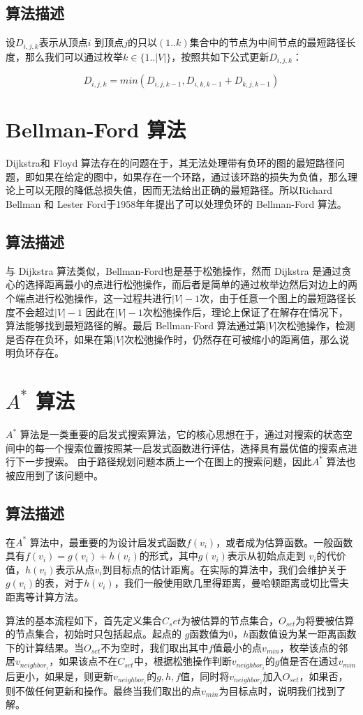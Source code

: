 \documentclass{standalone}
\begin{document}
\subsection{算法描述}
设$D_{i,j,k}$表示从顶点$i$ 到顶点$j$的只以$(1..k)$集合中的节点为中间节点的最短路径长度，那么我们可以通过枚举$k \in \{1..|V|\}$，按照共如下公式更新$D_{i,j,k}$：
\begin{center}
    \begin{equation}
    D_{i,j,k} = min(D_{i,j,k-1}, D_{i,k,k-1} + D_{k,j,k-1})
\end{equation}
\end{center}
\section{Bellman-Ford 算法}
Dijkstra和 Floyd 算法存在的问题在于，其无法处理带有负环的图的最短路径问题，即如果在给定的图中，如果存在一个环路，通过该环路的损失为负值，那么理论上可以无限的降低总损失值，因而无法给出正确的最短路径。所以Richard Bellman 和 Lester Ford于1958年年提出了可以处理负环的 Bellman-Ford 算法。
\subsection{算法描述}
与 Dijkstra 算法类似，Bellman-Ford也是基于松弛操作，然而 Dijkstra 是通过贪心的选择距离最小的点进行松弛操作，而后者是简单的通过枚举边然后对边上的两个端点进行松弛操作，这一过程共进行$|V|-1$次，由于任意一个图上的最短路径长度不会超过$|V|-1$
因此在$|V|-1$次松弛操作后，理论上保证了在解存在情况下，算法能够找到最短路径的解。最后 Bellman-Ford 算法通过第$|V|$次松弛操作，检测是否存在负环，如果在第$|V|$次松弛操作时，仍然存在可被缩小的距离值，那么说明负环存在。
\section{$A^{*}$ 算法}
$A^{*}$ 算法是一类重要的启发式搜索算法，它的核心思想在于，通过对搜索的状态空间中的每一个搜索位置按照某一启发式函数进行评估，选择具有最优值的搜索点进行下一步搜索。
由于路径规划问题本质上一个在图上的搜索问题，因此$A^{*}$ 算法也被应用到了该问题中。
\subsection{算法描述}
在$A^{*}$ 算法中，最重要的为设计启发式函数$f(v_i)$，或者成为估算函数。一般函数具有$f(v_i) = g(v_i) + h(v_i)$的形式，其中$g(v_i)$表示从初始点走到 $v_i$的代价值，$h(v_i)$表示从点$v_i$到目标点的估计距离。在实际的算法中，我们会维护关于$g(v_i)$的表，对于$h(v_i)$，我们一般使用欧几里得距离，曼哈顿距离或切比雪夫距离等计算方法。\par
算法的基本流程如下，首先定义集合$C_set$为被估算的节点集合，$O_{set}$为将要被估算的节点集合，初始时只包括起点。起点的 $g$函数值为0，$h$函数值设为某一距离函数下的计算结果。当$O_{set}$不为空时，我们取出其中$f$值最小的点$v_{min}$，枚举该点的邻居$v_{neighbor_i}$，如果该点不在$C_{set}$中，根据松弛操作判断$v_{neighbor_i}$的$g$值是否在通过$v_{min}$后更小，如果是，则更新$v_{neighbor_i}$的$g, h, f$值，同时将$v_{neighbor_i}$加入$O_{set}$，如果否，则不做任何更新和操作。最终当我们取出的点$v_{min}$为目标点时，说明我们找到了解。
\end{document}
